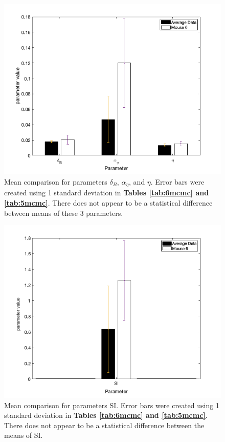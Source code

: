 \documentclass{article}
\begin{document}
\begin{figure}[H]
    \centering
    \includegraphics[width=15cm]{MCMC_figs/dram_t1d_final/mouse6_avg_paramComp1.png}
    \caption{Mean comparison for parameters $\delta_B$, $\alpha_{\eta}$, and $\eta$. Error bars were created using 1 standard deviation in \textbf{Tables \ref{tab:6mcmc} and \ref{tab:5mcmc}}. There does not appear to be a statistical difference between means of these 3 parameters.}
    \label{fig:22mcmc}
\end{figure} 
\begin{figure}[H]
    \centering
    \includegraphics[width=15cm]{MCMC_figs/dram_t1d_final/mouse6_avg_paramComp_SIONLY.png}
    \caption{Mean comparison for parameters SI. Error bars were created using 1 standard deviation in \textbf{Tables \ref{tab:6mcmc} and \ref{tab:5mcmc}}. There does not appear to be a statistical difference between the means of SI.}
    \label{fig:23mcmc}
\end{figure}
\end{document}
